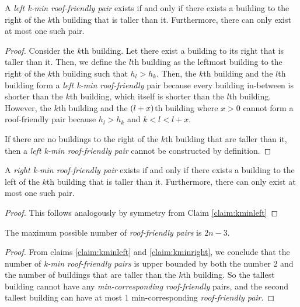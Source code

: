 \documentclass[10pt]{../usamts}
\begin{document}
\begin{solution}{3}
\begin{claim}
    A \textit{left k-min roof-friendly pair} exists if and only if there exists a building to the right of the $k$th building that is taller than it. Furthermore, there can only exist at most one such pair.
    \label{claim:kminleft}
\end{claim}

\begin{proof}
    Consider the $k$th building. Let there exist a building to its right that is taller than it. Then, we define the $l$th building as the leftmost building to the right of the $k$th building such that $h_l > h_k$. Then, the $k$th building and the $l$th building form a \textit{left k-min roof-friendly} pair because every building in-between is shorter than the $k$th building, which itself is shorter than the $l$th building. However, the $k$th building and the $\left( l+x \right)$th building where $x > 0$ cannot form a roof-friendly pair because $h_l > h_k$ and $k < l < l+x$.
    
    If there are no buildings to the right of the $k$th building that are taller than it, then a \textit{left k-min roof-friendly pair} cannot be constructed by definition.
\end{proof}

\begin{claim}
    A \textit{right k-min roof-friendly pair} exists if and only if there exists a building to the left of the $k$th building that is taller than it. Furthermore, there can only exist at most one such pair.
    \label{claim:kminright}
\end{claim}

\begin{proof}
    This follows analogously by symmetry from Claim \ref{claim:kminleft}
\end{proof}

\begin{claim}
    The maximum possible number of \textit{roof-friendly pairs} is $\boxed{2n-3}$.
\end{claim}

\begin{proof}
     From claims \ref{claim:kminleft} and \ref{claim:kminright}, we conclude that the number of \textit{k-min roof-friendly pairs} is upper bounded by both the number 2 and the number of buildings that are taller than the $k$th building. So the tallest building cannot have any \textit{min-corresponding roof-friendly} pairs, and the second tallest building can have at most 1 min-corresponding \textit{roof-friendly pair}.
    

\end{proof}
\end{solution}
\end{document}
